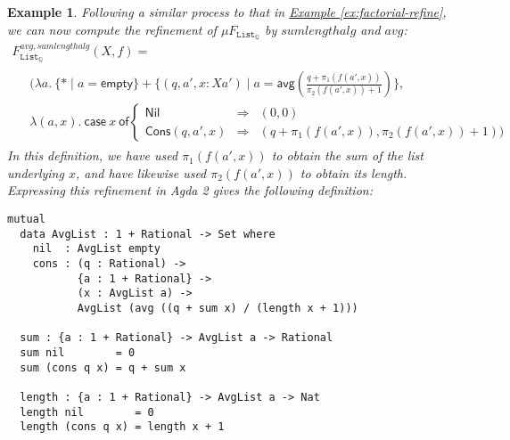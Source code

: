 \documentclass{LMCS}
\newcommand{\tyname}[1]{\texttt{#1}}
\newcommand{\sepbar}{\mathrel|}
\newtheorem{eorollary}{Example}
\newcommand{\exref}[1]{\hyperref[#1]{Example \ref*{#1}}}
\begin{document}
\begin{eorollary}
  Following a similar process to that in
  \exref{ex:factorial-refine}, we can now compute the refinement of
  $\mu F_{\tyname{List}_{\mathbb{Q}}}$ by $\mathit{sumlengthalg}$ and
  $\mathit{avg}$:
  \begin{displaymath}
    \begin{array}{l}
      F_{\tyname{List}_{\mathbb{Q}}}^{\mathit{avg},\mathit{sumlengthalg}}(X,f) = \\
      \quad
      \begin{array}{l}
       ( \lambda a.\ \{ * \sepbar a = \mathsf{empty} \} + \{ (q,a',x : Xa')
\sepbar a = \mathsf{avg}(\frac{q + \pi_1(f(a',x))}{\pi_2(f(a',x)) + 1}) \}, \\
        \lambda (a,x).\ \mathsf{case}\ x\ \mathsf{of}
        \left\{
          \begin{array}{lcl}
            \mathsf{Nil} & \Rightarrow & (0,0) \\
            \mathsf{Cons}(q,a',x) & \Rightarrow & (q + \pi_1(f(a',x)),
\pi_2(f(a',x)) + 1))
          \end{array}
        \right.
      \end{array}
    \end{array}
  \end{displaymath}
  In this definition, we have used $\pi_1(f(a',x))$ to obtain the sum
  of the list underlying $x$, and have likewise used $\pi_2(f(a',x))$
  to obtain its length. Expressing this refinement in Agda 2 gives the
  following definition:
\begin{verbatim}
mutual
  data AvgList : 1 + Rational -> Set where
    nil  : AvgList empty
    cons : (q : Rational) ->
           {a : 1 + Rational} ->
           (x : AvgList a) ->
           AvgList (avg ((q + sum x) / (length x + 1)))

  sum : {a : 1 + Rational} -> AvgList a -> Rational
  sum nil        = 0
  sum (cons q x) = q + sum x

  length : {a : 1 + Rational} -> AvgList a -> Nat
  length nil        = 0
  length (cons q x) = length x + 1
\end{verbatim}

\end{eorollary}
\end{document}
